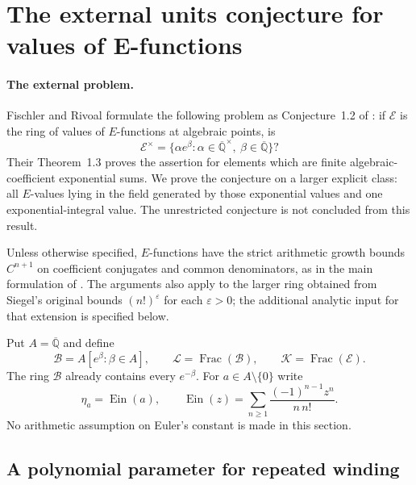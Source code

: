 \documentclass[11pt,a4paper]{article}
\numberwithin{equation}{section}
\theoremstyle{definition}
\theoremstyle{remark}
\begin{document}

\section{The external units conjecture for values of E-functions}
\label{ev:units-section}

\paragraph{The external problem.}
Fischler and Rivoal formulate the following problem as Conjecture~1.2
of \cite{FR2026}: if $\mathcal E$ is the ring of values of $E$-functions
at algebraic points, is
\[
 \mathcal E^\times
 =\{\alpha e^\beta:\alpha\in\overline{\mathbb Q}^{\times},
                         \ \beta\in\overline{\mathbb Q}\}?
\]
Their Theorem~1.3 proves the assertion for elements which are finite
algebraic-coefficient exponential sums.  We prove the conjecture on a
larger explicit class: all $E$-values lying in the field generated by
those exponential values and one exponential-integral value.  The
unrestricted conjecture is not concluded from this result.

Unless otherwise specified, $E$-functions have the strict arithmetic
growth bounds $C^{n+1}$ on coefficient conjugates and common
denominators, as in the main formulation of \cite{FR2026}.  The
arguments also apply to the larger ring obtained from Siegel's
original bounds $(n!)^\varepsilon$ for each $\varepsilon>0$; the
additional analytic input for that extension is specified below.

Put $A=\overline{\mathbb Q}$ and define
\[
 \mathcal B=A[e^\beta:\beta\in A],\qquad
 \mathcal L=\operatorname{Frac}(\mathcal B),\qquad
 \mathcal K=\operatorname{Frac}(\mathcal E).
\]
The ring $\mathcal B$ already contains every $e^{-\beta}$.
For $a\in A\setminus\{0\}$ write
\[
 \eta_a=\operatorname{Ein}(a),\qquad
 \operatorname{Ein}(z)=\sum_{n\ge1}\frac{(-1)^{n-1}z^n}{n\,n!}.
\]
No arithmetic assumption on Euler's constant is made in this section.

\subsection{A polynomial parameter for repeated winding}
\end{document}
